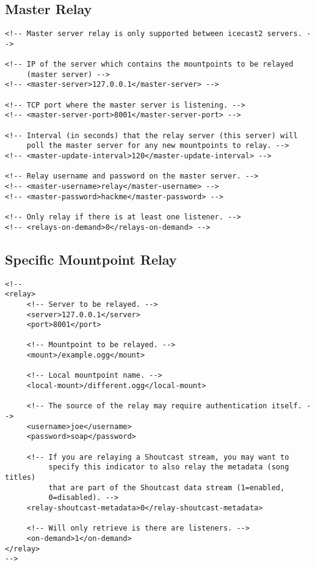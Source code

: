\subsection{Master Relay}
\begin{lstlisting}
<!-- Master server relay is only supported between icecast2 servers. -->

<!-- IP of the server which contains the mountpoints to be relayed
     (master server) -->
<!-- <master-server>127.0.0.1</master-server> -->

<!-- TCP port where the master server is listening. -->
<!-- <master-server-port>8001</master-server-port> -->

<!-- Interval (in seconds) that the relay server (this server) will
     poll the master server for any new mountpoints to relay. -->
<!-- <master-update-interval>120</master-update-interval> -->

<!-- Relay username and password on the master server. -->
<!-- <master-username>relay</master-username> -->
<!-- <master-password>hackme</master-password> -->

<!-- Only relay if there is at least one listener. -->
<!-- <relays-on-demand>0</relays-on-demand> -->
\end{lstlisting}


\subsection{Specific Mountpoint Relay}

\begin{lstlisting}
<!--
<relay>
     <!-- Server to be relayed. -->
     <server>127.0.0.1</server>
     <port>8001</port>

     <!-- Mountpoint to be relayed. -->
     <mount>/example.ogg</mount>

     <!-- Local mountpoint name. -->
     <local-mount>/different.ogg</local-mount>

     <!-- The source of the relay may require authentication itself. -->
     <username>joe</username>
     <password>soap</password>

     <!-- If you are relaying a Shoutcast stream, you may want to
          specify this indicator to also relay the metadata (song titles)
          that are part of the Shoutcast data stream (1=enabled,
          0=disabled). -->
     <relay-shoutcast-metadata>0</relay-shoutcast-metadata>

     <!-- Will only retrieve is there are listeners. -->
     <on-demand>1</on-demand>
</relay>
-->
\end{lstlisting}

